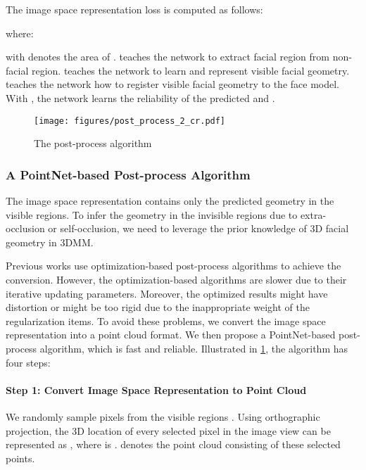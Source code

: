 \documentclass[10pt,twocolumn,letterpaper]{article}
\begin{document}
The image space representation loss  is computed as follows:

where:
\begin{small}

\end{small}
\hspace{-0.2cm} with  denotes the area of .
 teaches the network to extract facial region from non-facial region.  teaches the network to learn and represent visible facial geometry.  teaches the network how to register visible facial geometry to the face model. With , the network learns the reliability of the predicted  and .

\begin{figure}[t]
  \centering
   \texttt{[image: figures/post\_process\_2\_cr.pdf]}

   \caption{The post-process algorithm}
   \label{fig:post_process}
\end{figure}

\subsubsection{A PointNet-based Post-process Algorithm}
The image space representation contains only the predicted geometry in the visible regions. To infer the geometry in the invisible regions due to extra-occlusion or self-occlusion, we need to leverage the prior knowledge of 3D facial geometry in 3DMM. 

Previous works use optimization-based post-process algorithms to achieve the conversion. However, the optimization-based algorithms are slower due to their iterative updating parameters. 
Moreover, the optimized results might have distortion or might be too rigid due to the inappropriate weight of the regularization items.
To avoid these problems, we convert the image space representation into a point cloud format.
We then propose a PointNet-based post-process algorithm, which is fast and reliable. Illustrated in \cref{fig:post_process}, the algorithm has four steps: 

\vspace{-0.3cm}
\paragraph{Step 1: Convert Image Space Representation to Point Cloud} 
We randomly sample  pixels from the visible regions . 
Using orthographic projection, the 3D location  of every selected pixel  in the image view can be represented as , where  is .  denotes the point cloud consisting of these selected points.
\end{document}
